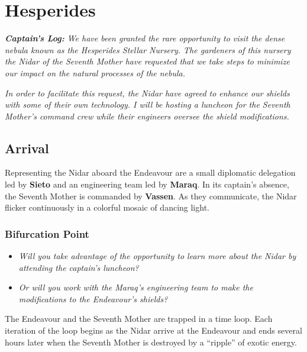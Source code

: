 \documentclass[11pt, a5paper, parskip=half-, DIV=12]{scrartcl}
\begin{document}
\section*{Hesperides}
\textit{\textbf{Captain's Log:} We have been granted the rare opportunity to visit the dense nebula known as the Hesperides Stellar Nursery. The gardeners of this nursery \textemdash{} the Nidar of the Seventh Mother \textemdash{} have requested that we take steps to minimize our impact on the natural processes of the nebula.}

\textit{In order to facilitate this request, the Nidar have agreed to enhance our shields with some of their own technology. I will be hosting a luncheon for the Seventh Mother's command crew while their engineers oversee the shield modifications.}

\subsection*{Arrival}
Representing the Nidar aboard the Endeavour are a small diplomatic delegation led by \textbf{Sieto} and an engineering team led by \textbf{Maraq}.
In its captain's absence, the Seventh Mother is commanded by \textbf{Vassen}.
As they communicate, the Nidar flicker continuously in a colorful mosaic of dancing light.
\subsubsection*{Bifurcation Point}
\begin{itemize}
	\item \textit{Will you take advantage of the opportunity to learn more about the Nidar by attending the captain's luncheon?} 
	\item \textit{Or will you work with the Maraq's engineering team to make the modifications to the Endeavour's shields?} 
\end{itemize}

The Endeavour and the Seventh Mother are trapped in a time loop. Each iteration of the loop begins as the Nidar arrive at the Endeavour and ends several hours later when the Seventh Mother is destroyed by a ``ripple'' of exotic energy.

\end{document}
